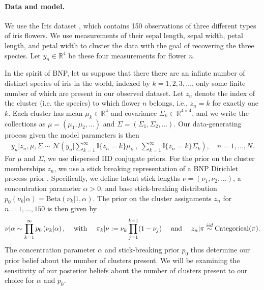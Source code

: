 \paragraph{Data and model.}
We use the Iris dataset \citep{iris_data_anderson, iris_data_fisher}, which
contains 150 observations of three different types of iris flowers. We use
measurements of their sepal length, sepal width, petal length, and petal width
to cluster the data with the goal of recovering the three species. Let $y_{n}\in
\mathbb{R}^4$ be these four measurements for flower $n$.

In the spirit of BNP, let us suppose that there there are an infinte number of
distinct species of iris in the world, indexed by $k=1,2,3,\ldots$, only some
finite number of which are present in our observed dataset.  Let $z_n$ denote
the index of the cluster (i.e. the species) to which flower $n$ belongs, i.e.,
$z_n = k$ for exactly one $k$. Each cluster has mean $\mu_k\in
\mathbb{R}^4$ and covariance $\Sigma_k \in \mathbb{R}^{4\times 4}$, and we write
the collections as $\mu = \left(\mu_1, \mu_2, ...\right)$ and $\Sigma =
\left(\Sigma_1, \Sigma_2, ... \right)$. Our data-generating process given the
model parameters is then
%
\begin{align*}
	y_n | z_n, \mu, \Sigma \sim
        \mathcal{N}\left(
            y_n \Big\vert
                \sum_{k=1}^\infty \mathbb{I}\{z_n = k\} \mu_k \;,
              \; \sum_{k=1}^\infty \mathbb{I}\{z_n = k\} \Sigma_k\right),
	\quad n = 1, ..., N.
\end{align*}
%
For $\mu$ and $\Sigma$, we use dispersed IID conjugate priors. For the prior on
the cluster memberships $z_n$, we use a stick breaking representation of a BNP
Dirichlet process prior \citep{ferguson:1973:bayesian,
sethuraman:1994:constructivedp}. Specifically, we define latent stick lengths
$\nu=\left(\nu_1, \nu_2, ...\right)$, a concentration parameter $\alpha>0$, and
base stick-breaking distribution $p_{0}\left(\nu_k \vert \alpha \right) =
\mathrm{Beta}\left(\nu_k \Big\vert 1, \alpha \right)$.  The prior on the cluster
assignments $z_n$ for $n=1,...,150$ is then given by
%
\begin{align}
\nu \vert \alpha \sim \prod_{k=1}^\infty p_{0}\left(\nu_k \vert \alpha \right)
\textrm{,}
    \quad\textrm{ with }\quad
\pi_k | \nu := \nu_k \prod_{j=1}^{k-1} (1 - \nu_j)
\quad\textrm{ and }\quad
z_n \vert \pi \stackrel{iid}{\sim} \mathrm{Categorical}(\pi). \label{eq:stick_breaking}
\end{align}
%
The concentration parameter $\alpha$ and stick-breaking prior $p_{0}$
thus determine our prior belief about the number of clusters present.
We will be examining the sensitivity of our posterior beliefs about the
number of clusters present to our choice for $\alpha$ and $p_{0}$.
